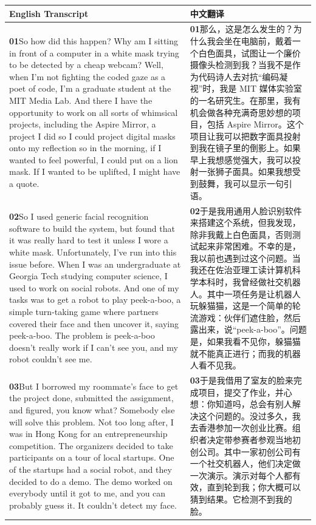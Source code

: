 \documentclass[UTF8,zihao=-4,fontset=fandol]{ctexart}
\newcommand{\TranscriptColumn}{\raggedright\arraybackslash\hyphenpenalty=10000\exhyphenpenalty=10000\sloppy}
\begin{document}
\renewcommand{\arraystretch}{1.23}
\begin{longtable}{>{\TranscriptColumn}p{} >{\TranscriptColumn}p{}}
\rowcolor{headerBg}\textbf{English Transcript} & \textbf{中文翻译} \\ \hline
\textbf{01}\quad So how did this happen? Why am I sitting in front of a computer in a white mask trying to be detected by a cheap webcam? Well, when I'm not fighting the coded gaze as a poet of code, I'm a graduate student at the MIT Media Lab. And there I have the opportunity to work on all sorts of whimsical projects, including the Aspire Mirror, a project I did so I could project digital masks onto my reflection so in the morning, if I wanted to feel powerful, I could put on a lion mask. If I wanted to be uplifted, I might have a quote. & \textbf{01}\quad 那么，这是怎么发生的？为什么我会坐在电脑前，戴着一个白色面具，试图让一个廉价摄像头检测到我？当我不是作为代码诗人去对抗“编码凝视”时，我是 MIT 媒体实验室的一名研究生。在那里，我有机会做各种充满奇思妙想的项目，包括 Aspire Mirror。这个项目让我可以把数字面具投射到我在镜子里的倒影上。如果早上我想感觉强大，我可以投射一张狮子面具。如果我想受到鼓舞，我可以显示一句引语。 \\ \hline
\textbf{02}\quad So I used generic facial recognition software to build the system, but found that it was really hard to test it unless I wore a white mask. Unfortunately, I've run into this issue before. When I was an undergraduate at Georgia Tech studying computer science, I used to work on social robots. And one of my tasks was to get a robot to play peek-a-boo, a simple turn-taking game where partners covered their face and then uncover it, saying peek-a-boo. The problem is peek-a-boo doesn't really work if I can't see you, and my robot couldn't see me. & \textbf{02}\quad 于是我用通用人脸识别软件来搭建这个系统，但我发现，除非我戴上白色面具，否则测试起来非常困难。不幸的是，我以前也遇到过这个问题。当我还在佐治亚理工读计算机科学本科时，我曾经做社交机器人。其中一项任务是让机器人玩躲猫猫，这是一个简单的轮流游戏：伙伴们遮住脸，然后露出来，说“peek-a-boo”。问题是，如果我看不见你，躲猫猫就不能真正进行；而我的机器人看不见我。 \\ \hline
\textbf{03}\quad But I borrowed my roommate's face to get the project done, submitted the assignment, and figured, you know what? Somebody else will solve this problem. Not too long after, I was in Hong Kong for an entrepreneurship competition. The organizers decided to take participants on a tour of local startups. One of the startups had a social robot, and they decided to do a demo. The demo worked on everybody until it got to me, and you can probably guess it. It couldn't detect my face. & \textbf{03}\quad 于是我借用了室友的脸来完成项目，提交了作业，并心想：你知道吗，总会有别人解决这个问题的。没过多久，我去香港参加一次创业比赛。组织者决定带参赛者参观当地初创公司。其中一家初创公司有一个社交机器人，他们决定做一次演示。演示对每个人都有效，直到轮到我；你大概可以猜到结果。它检测不到我的脸。 \\ \hline

\end{longtable}
\end{document}
